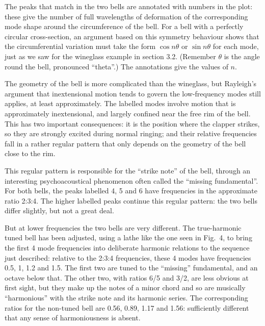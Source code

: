   The peaks that match in the two bells are annotated with numbers in the plot: 
  these give the number of full wavelengths of deformation of the corresponding 
  mode shape around the circumference of the bell. For a bell with a perfectly 
  circular cross-section, an argument based on this symmetry behaviour shows 
  that the circumferential variation must take the form $\cos n \theta$ or 
  $\sin n \theta$ for each mode, just as we saw for the wineglass example in 
  section 3.2. (Remember $\theta$ is the angle round the bell, pronounced 
  ``theta''.) The annotations give the values of $n$. 

  The geometry of the bell is more complicated than the wineglass, but 
  Rayleigh's argument that inextensional motion tends to govern the 
  low-frequency modes still applies, at least approximately. The labelled modes 
  involve motion that is approximately inextensional, and largely confined near 
  the free rim of the bell. This has two important consequences: it is the 
  position where the clapper strikes, so they are strongly excited during 
  normal ringing; and their relative frequencies fall in a rather regular 
  pattern that only depends on the geometry of the bell close to the rim. 

  This regular pattern is responsible for the ``strike note'' of the bell, 
  through an interesting psychoacoustical phenomenon often called the ``missing 
  fundamental''. For both bells, the peaks labelled 4, 5 and 6 have frequencies 
  in the approximate ratio 2:3:4. The higher labelled peaks continue this 
  regular pattern: the two bells differ slightly, but not a great deal. 

  But at lower frequencies the two bells are very different. The true-harmonic 
  tuned bell has been adjusted, using a lathe like the one seen in Fig.\ 4, to 
  bring the first 4 mode frequencies into deliberate harmonic relations to the 
  sequence just described: relative to the 2:3:4 frequencies, these 4 modes 
  have frequencies 0.5, 1, 1.2 and 1.5. The first two are tuned to the 
  ``missing'' fundamental, and an octave below that. The other two, with ratios 
  6/5 and 3/2, are less obvious at first sight, but they make up the notes of a 
  minor chord and so are musically ``harmonious'' with the strike note and its 
  harmonic series. The corresponding ratios for the non-tuned bell are 0.56, 
  0.89, 1.17 and 1.56: sufficiently different that any sense of harmoniousness 
  is absent. 

